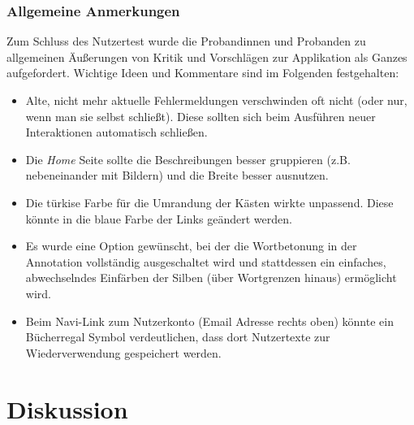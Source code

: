 \subsubsection{Allgemeine Anmerkungen}

Zum Schluss des Nutzertest wurde die Probandinnen und Probanden zu allgemeinen Äußerungen von Kritik und Vorschlägen zur Applikation als Ganzes aufgefordert. Wichtige Ideen und Kommentare sind im Folgenden festgehalten:

\begin{itemize}
	\item Alte, nicht mehr aktuelle Fehlermeldungen verschwinden oft nicht (oder nur, wenn man sie selbst schließt). Diese sollten sich beim Ausführen neuer Interaktionen automatisch schließen.
	\item Die \textit{Home} Seite sollte die Beschreibungen besser gruppieren (z.B. nebeneinander mit Bildern) und die Breite besser ausnutzen.
	\item Die türkise Farbe für die Umrandung der Kästen wirkte unpassend. Diese könnte in die blaue Farbe der Links geändert werden.
	\item Es wurde eine Option gewünscht, bei der die Wortbetonung in der Annotation vollständig ausgeschaltet wird und stattdessen ein einfaches, abwechselndes Einfärben der Silben (über Wortgrenzen hinaus) ermöglicht wird.
	\item Beim Navi-Link zum Nutzerkonto (Email Adresse rechts oben) könnte ein Bücherregal Symbol verdeutlichen, dass dort Nutzertexte zur Wiederverwendung gespeichert werden.
\end{itemize}

\newpage
\section{Diskussion}

